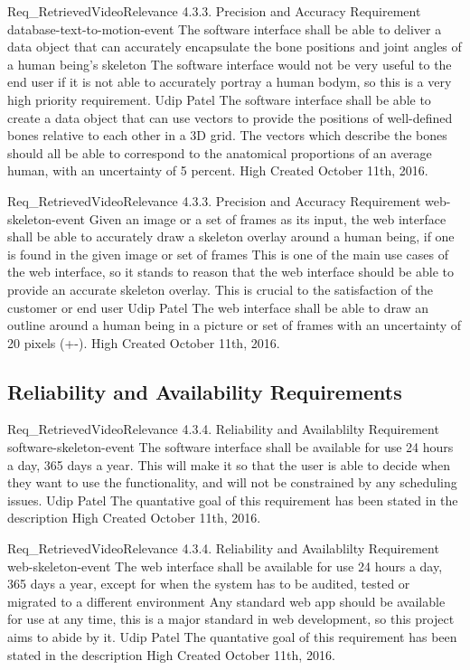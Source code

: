 \documentclass{scrreprt}
\begin{document}
\requirement
{Req_RetrievedVideoRelevance}
{4.3.3. Precision and Accuracy Requirement}
{database-text-to-motion-event}
{The software interface shall be able to deliver a data object that can accurately encapsulate the bone positions and joint angles of a human being's skeleton}
{The software interface would not be very useful to the end user if it is not able to accurately portray a human bodym, so this is a very high priority requirement.}
{Udip Patel}
{The software interface shall be able to create a data object that can use vectors to provide the positions of well-defined bones relative to each other in a 3D grid. The vectors which describe the bones should all be able to correspond to the anatomical proportions of an average human, with an uncertainty of 5 percent.}
{High}
{Created October 11th, 2016.}

\requirement
{Req_RetrievedVideoRelevance}
{4.3.3. Precision and Accuracy Requirement}
{web-skeleton-event}
{Given an image or a set of frames as its input, the web interface shall be able to accurately draw a skeleton overlay around a human being, if one is found in the given image or set of frames}
{This is one of the main use cases of the web interface, so it stands to reason that the web interface should be able to provide an accurate skeleton overlay. This is crucial to the satisfaction of the customer or end user }
{Udip Patel}
{The web interface shall be able to draw an outline around a human being in a picture or set of frames with an uncertainty of 20 pixels (+-).}
{High}
{Created October 11th, 2016.}

\subsection{Reliability and Availability Requirements}

\requirement
{Req_RetrievedVideoRelevance}
{4.3.4. Reliability and Availablilty Requirement}
{software-skeleton-event}
{The software interface shall be available for use 24 hours a day, 365 days a year.}
{This will make it so that the user is able to decide when they want to use the functionality, and will not be constrained by any scheduling issues.}
{Udip Patel}
{The quantative goal of this requirement has been stated in the description}
{High}
{Created October 11th, 2016.}

\requirement
{Req_RetrievedVideoRelevance}
{4.3.4. Reliability and Availablilty Requirement}
{web-skeleton-event}
{The web interface shall be available for use 24 hours a day, 365 days a year, except for when the system has to be audited, tested or migrated to a different environment}
{Any standard web app should be available for use at any time, this is a major standard in web development, so this project aims to abide by it.}
{Udip Patel}
{The quantative goal of this requirement has been stated in the description}
{High}
{Created October 11th, 2016.}
\end{document}
